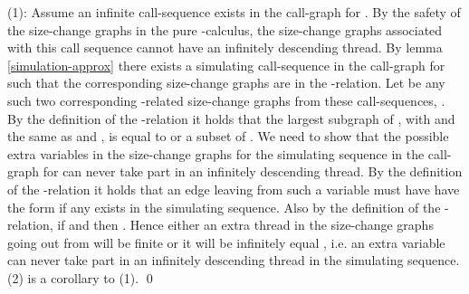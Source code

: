 \documentclass{LMCS}
\newcommand{\bprf}{\proof}
\newcommand{\eprf}{\qed}
\theoremstyle{definition}\newtheorem{env}[thm]{Environment}
\begin{document}
\bprf 
(1): Assume an infinite call-sequence 
exists in the call-graph for . By the safety of the size-change graphs in the pure -calculus, the size-change graphs associated with this call sequence cannot have an infinitely descending thread. By lemma \ref{simulation-approx} there exists a simulating call-sequence in the call-graph for  such that  the corresponding size-change graphs are in the -relation. 
Let  be any such two corresponding -related size-change graphs from these call-sequences, . 
By the definition of the -relation it holds that the largest subgraph of , with  and  the same as   and ,  is equal to or a subset of . 
 We need to show that the possible extra variables in the size-change graphs for the simulating sequence in the call-graph for  can never take part in an infinitely descending thread. By the definition of the -relation it holds that 
an edge leaving from such a variable  must have have the form  if any exists in the simulating sequence. Also by the definition of the -relation, if  and  then . Hence either an extra thread in the size-change graphs going out from  will be finite or it will be infinitely equal , i.e. an extra variable can never take part in an infinitely descending thread in the simulating sequence.\\
(2) is a corollary to (1).
\eprf
\end{document}
